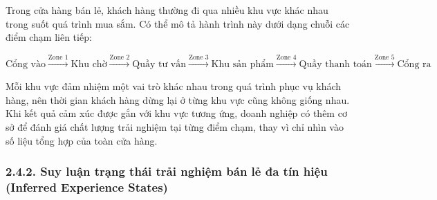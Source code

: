 Trong cửa hàng bán lẻ, khách hàng thường đi qua nhiều khu vực khác nhau trong suốt quá trình mua sắm. Có thể mô tả hành trình này dưới dạng chuỗi các điểm chạm liên tiếp:
\begin{center}
$\text{Cổng vào} \xrightarrow{\text{Zone 1}} \text{Khu chờ} \xrightarrow{\text{Zone 2}} \text{Quầy tư vấn} \xrightarrow{\text{Zone 3}} \text{Khu sản phẩm} \xrightarrow{\text{Zone 4}} \text{Quầy thanh toán} \xrightarrow{\text{Zone 5}} \text{Cổng ra}$
\end{center}
Mỗi khu vực đảm nhiệm một vai trò khác nhau trong quá trình phục vụ khách hàng, nên thời gian khách hàng dừng lại ở từng khu vực cũng không giống nhau. Khi kết quả cảm xúc được gắn với khu vực tương ứng, doanh nghiệp có thêm cơ sở để đánh giá chất lượng trải nghiệm tại từng điểm chạm, thay vì chỉ nhìn vào số liệu tổng hợp của toàn cửa hàng.

\subsubsection*{2.4.2. Suy luận trạng thái trải nghiệm bán lẻ đa tín hiệu (Inferred Experience States)}

